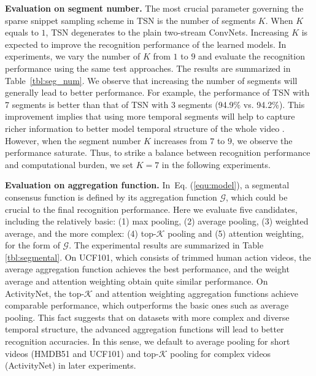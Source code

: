 \documentclass[10pt,journal,compsoc]{IEEEtran}
\begin{document}
{\bf Evaluation on segment number.}
The most crucial parameter governing the sparse snippet sampling scheme in TSN is the number of segments $ K $. When $ K $ equals to $ 1 $, TSN degenerates to the plain two-stream ConvNets. Increasing $ K $ is expected to improve the recognition performance of the learned models. In experiments, we vary the number of $ K $ from $ 1 $ to $ 9 $ and evaluate the recognition performance using the same test approaches. 
The results are summarized in Table~\ref{tbl:seg_num}. We observe that increasing the number of segments will generally lead to better performance. For example, the performance of TSN with 7 segments is better than that of TSN with 3 segments (94.9\% vs. 94.2\%). This improvement implies that using more temporal segments will help to capture richer information to better model temporal structure of the whole video . However, when the segment number $ K $ increases from $ 7 $ to $ 9 $, we observe the performance saturate. Thus, to strike a balance between recognition performance and computational burden, we set $ K=7 $ in the following experiments.

{\bf Evaluation on aggregation function.} In~Eq. (\ref{equ:model}), a segmental consensus function is defined by its aggregation function $ \mathcal{G} $, which could be crucial to the final recognition performance.
Here we evaluate five candidates, including the relatively basic: (1) max pooling, (2) average pooling, (3) weighted average, and the more complex: (4) top-$ \mathcal{K} $ pooling and (5) attention weighting, for the form of $ \mathcal{G} $. 
The experimental results are summarized in Table \ref{tbl:segmental}. On UCF101, which consists of trimmed human action videos, the average aggregation function achieves the best performance, and the weight average and attention weighting obtain quite similar performance. On ActivityNet, the top-$ \mathcal{K} $ and attention weighting aggregation functions achieve comparable performance, which outperforms the basic ones such as average pooling. This fact suggests that on datasets with more complex and diverse temporal structure, the advanced aggregation functions will lead to better recognition accuracies.
In this sense, we default to average pooling for short videos (HMDB51 and UCF101) and top-$ \mathcal{K} $ pooling for complex videos (ActivityNet) in later experiments.
\end{document}

